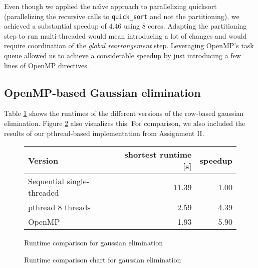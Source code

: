 \documentclass[]{article}
\begin{document}
Even though we applied the na\"{\i}ve approach to parallelizing quicksort (parallelizing the recursive calls to \texttt{quick\_sort} and not the partitioning), we achieved a substantial speedup of $4.46$ using $8$ cores. Adapting the partitioning step to run multi-threaded would mean introducing a lot of changes and would require coordination of the \textit{global rearrangement} step. Leveraging OpenMP's task queue allowed us to achieve a considerable speedup by just introducing a few lines of OpenMP directives.

\subsection{OpenMP-based Gaussian elimination}

Table \ref{tab:gauss-runtime} shows the runtimes of the different versions of the row-based gaussian elimination. Figure \ref{fig:gauss-chart} also visualizes this. For comparison, we also included the results of our pthread-based implementation from Assignment II.

\begin{figure}[h]
	\centering
	\begin{tabular}{|l|r|r|}
		\hline
		\textbf{Version} & \textbf{shortest runtime [s]} & \textbf{speedup} \\
		\hline
		Sequential single-threaded		& 11.39 & 1.00 \\
		\hline
		pthread 8 threads				& 2.59	& 4.39 \\
		\hline 
		OpenMP 							& 1.93 & 5.90 \\ 
		\hline 
	\end{tabular} 
	\caption{Runtime comparison for gaussian elimination}
	\label{tab:gauss-runtime}
\end{figure}

\begin{figure}[h]
	\centering
	\caption{Runtime comparison chart for gaussian elimination}
	\label{fig:gauss-chart}
\end{figure}
\end{document}
